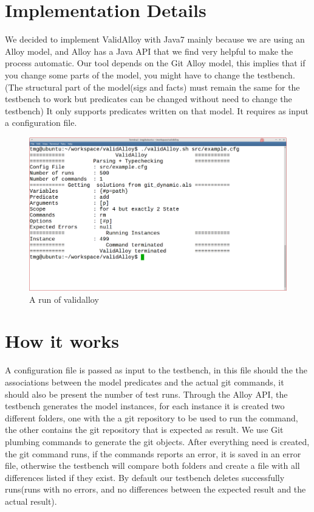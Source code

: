 \section{Implementation Details}

We decided to implement ValidAlloy with Java7 mainly because we are using an Alloy model, and Alloy has a Java API that we find very helpful to make the process automatic.
Our tool depends on the Git Alloy model, this implies that if you change some parts of the model, you might have to change the testbench.(The structural part of the model(sigs and facts) must remain the same for the testbench to work but predicates can be changed without need to change the testbench)
It only supports predicates written on that model.
It requires as input a configuration file.

\begin{figure}[H]
\centering
\includegraphics[width=\textwidth]{images/SHELL.png}
\caption{A run of validalloy}
\end{figure}

\section{How it works}

A configuration file is passed as input to the testbench, in this file should the the associations between the model predicates and the actual git commands, it should also be present the number of test runs.
Through the Alloy API, the testbench generates the model instances, for each instance it is created two different folders, one with the a git repository to be used to run the  command, the other contains the git repository that is expected as result.
We use Git plumbing commands to generate the git objects.
After everything need is created, the git command runs, if the commands reports an error, it is saved in an error file, otherwise the testbench will compare both folders and create a file with all differences listed if they exist.
By default our testbench deletes successfully runs(runs with no errors, and no differences between the expected result and the actual result).

